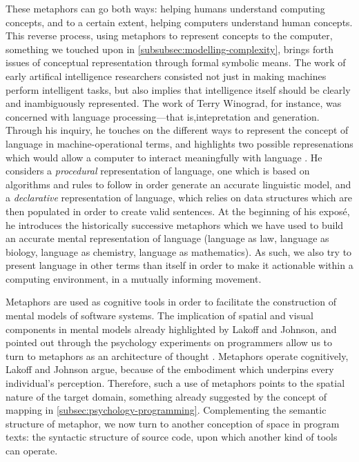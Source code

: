 These metaphors can go both ways: helping humans understand computing concepts, and to a certain extent, helping computers understand human concepts. This reverse process, using metaphors to represent concepts to the computer, something we touched upon in \ref{subsubsec:modelling-complexity}, brings forth issues of conceptual representation through formal symbolic means. The work of early artifical intelligence researchers consisted not just in making machines perform intelligent tasks, but also implies that intelligence itself should be clearly and inambiguously represented. The work of Terry Winograd, for instance, was concerned with language processing—that is,intepretation and generation. Through his inquiry, he touches on the different ways to represent the concept of language in machine-operational terms, and highlights two possible represenations which would allow a computer to interact meaningfully with language  \citep{winograd_language_1982}. He considers a \emph{procedural} representation of language, one which is based on algorithms and rules to follow in order generate an accurate linguistic model, and a \emph{declarative} representation of language, which relies on data structures which are then populated in order to create valid sentences. At the beginning of his exposé, he introduces the historically successive metaphors which we have used to build an accurate mental representation of language (language as law, language as biology, language as chemistry, language as mathematics). As such, we also try to present language in other terms than itself in order to make it actionable within a computing environment, in a mutually informing movement.

Metaphors are used as cognitive tools in order to facilitate the construction of mental models of software systems. The implication of spatial and visual components in mental models already highlighted by Lakoff and Johnson, and pointed out through the psychology experiments on programmers allow us to turn to metaphors as an architecture of thought \citep{forsythe_cathedrals_1986}. Metaphors operate cognitively, Lakoff and Johnson argue, because of the embodiment which underpins every individual's perception. Therefore, such a use of metaphors points to the spatial nature of the target domain, something already suggested by the concept of mapping in \ref{subsec:psychology-programming}. Complementing the semantic structure of metaphor, we now turn to another conception of space in program texts: the syntactic structure of source code, upon which another kind of tools can operate.

